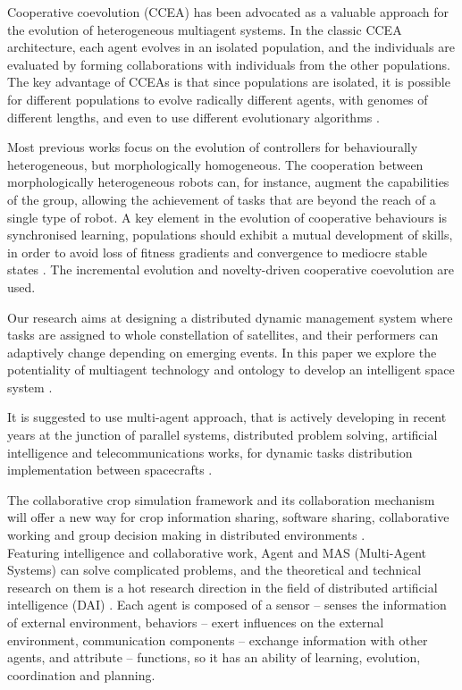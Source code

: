 \documentclass[letterpaper, 10 pt, conference]{ieeeconf}  %
\begin{document}
Cooperative coevolution (CCEA) has been advocated as a valuable approach for the evolution of heterogeneous multiagent systems. In the classic CCEA architecture, each agent evolves in an isolated population, and the individuals are evaluated by forming collaborations with individuals from the other populations. The key advantage of CCEAs is that since populations are isolated, it is possible for different populations to evolve radically different agents, with genomes of different lengths, and even to use different evolutionary algorithms  \cite{Gomes2015}.

Most previous works focus on the evolution of controllers for behaviourally heterogeneous, but morphologically homogeneous. The cooperation between morphologically heterogeneous robots can, for instance, augment the capabilities of the group, allowing the achievement of tasks that are beyond the reach of a single type of robot. A key element in the evolution of cooperative behaviours is synchronised learning, populations should exhibit a mutual development of skills, in order to avoid loss of fitness gradients and convergence to mediocre stable states  \cite{Gomes2015}. The incremental evolution and novelty-driven cooperative coevolution are used.

Our research aims at designing a distributed dynamic management system where tasks are assigned to whole constellation of satellites, and their performers can adaptively change depending on emerging events. In this paper we explore the potentiality of multiagent technology and ontology to develop an intelligent space system \cite{skobelev2016using}.

It is suggested to use multi-agent approach, that is actively developing in recent years at the junction of parallel systems, distributed problem solving, artificial intelligence and telecommunications works, for dynamic tasks distribution implementation between spacecrafts  \cite{skobelev2016using}.

The collaborative crop simulation framework and its collaboration mechanism will offer a new way for crop information sharing, software sharing, collaborative working and group decision making in distributed environments \cite{Ye-ping2011}. \\

Featuring intelligence and collaborative work, Agent and MAS (Multi-Agent Systems) can solve complicated problems, and the theoretical and technical research on them is a hot research direction in the field of distributed artificial intelligence (DAI)  \cite{Ye-ping2011}. Each agent is composed of a sensor – senses the information of external environment, behaviors – exert influences on the external environment, communication components – exchange information with other agents, and attribute – functions, so it has an ability of learning, evolution, coordination and planning.
\end{document}

